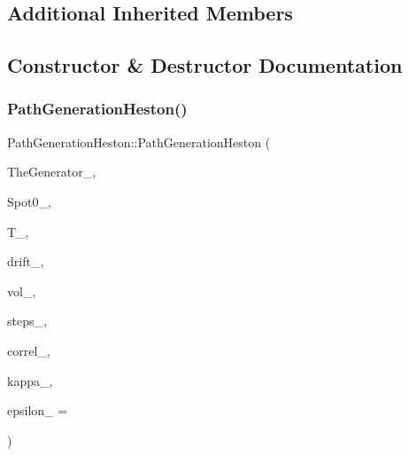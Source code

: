 \subsection*{Additional Inherited Members}


\subsection{Constructor \& Destructor Documentation}
\hypertarget{classPathGenerationHeston_a0a5d87404d3ad4316ae0da262c77112a}{}\label{classPathGenerationHeston_a0a5d87404d3ad4316ae0da262c77112a} 
\subsubsection{\texorpdfstring{Path\+Generation\+Heston()}{PathGenerationHeston()}\hspace{0.1cm}{\footnotesize\ttfamily [1/2]}}
{\footnotesize\ttfamily Path\+Generation\+Heston\+::\+Path\+Generation\+Heston (\begin{DoxyParamCaption}\item[{shared\+\_\+ptr$<$ \hyperlink{classRandomBase}{Random\+Base} $>$}]{The\+Generator\+\_\+,  }\item[{double}]{Spot0\+\_\+,  }\item[{double}]{T\+\_\+,  }\item[{const \hyperlink{classParameters}{Parameters} \&}]{drift\+\_\+,  }\item[{const \hyperlink{classParameters}{Parameters} \&}]{vol\+\_\+,  }\item[{unsigned long}]{steps\+\_\+,  }\item[{double}]{correl\+\_\+,  }\item[{double}]{kappa\+\_\+,  }\item[{double}]{epsilon\+\_\+ = {} }\end{DoxyParamCaption})}

\hypertarget{classPathGenerationHeston_af108753ddab26252b6a8a11c1b7e60c6}{}\label{classPathGenerationHeston_af108753ddab26252b6a8a11c1b7e60c6} 
